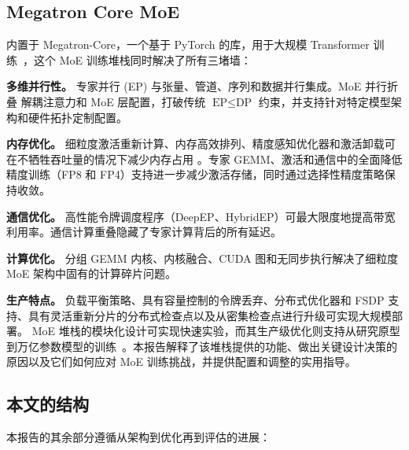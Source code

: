 \documentclass[10pt,logo,copyright]{nvidiatechreport_zh}
\begin{document}
\subsection{Megatron Core MoE}
内置于 Megatron-Core，一个基于 PyTorch 的库，用于大规模 Transformer 训练~\cite{shoeybi2020megatronlmtrainingmultibillionparameter,paszke2019pytorchimperativestylehighperformance}，这个 MoE 训练堆栈同时解决了所有三堵墙：

\textbf{多维并行性。} 专家并行 (EP) 与张量、管道、序列和数据并行集成。MoE 并行折叠 \cite{liu2025moeparallelfoldingheterogeneous} 解耦注意力和 MoE 层配置，打破传统 $\text{EP} \leq \text{DP}$ 约束，并支持针对特定模型架构和硬件拓扑定制配置。

\textbf{内存优化。} 细粒度激活重新计算、内存高效排列、精度感知优化器和激活卸载可在不牺牲吞吐量的情况下减少内存占用 \cite{korthikanti2022reducingactivationrecomputationlarge,a2023learningwithdistributedoptimization}。专家 GEMM、激活和通信中的全面降低精度训练（FP8 和 FP4）支持进一步减少激活存储，同时通过选择性精度策略保持收敛。

\textbf{通信优化。} 高性能令牌调度程序（DeepEP、HybridEP）可最大限度地提高带宽利用率。通信计算重叠隐藏了专家计算背后的所有延迟。

\textbf{计算优化。} 分组 GEMM 内核、内核融合、CUDA 图和无同步执行解决了细粒度 MoE 架构中固有的计算碎片问题。

\textbf{生产特点。} 负载平衡策略、具有容量控制的令牌丢弃、分布式优化器和 FSDP 支持、具有灵活重新分片的分布式检查点以及从密集检查点进行升级可实现大规模部署。
MoE 堆栈的模块化设计可实现快速实验，而其生产级优化则支持从研究原型到万亿参数模型的训练~\cite{nvidiamcoremoeuserguide}。本报告解释了该堆栈提供的功能、做出关键设计决策的原因以及它们如何应对 MoE 训练挑战，并提供配置和调整的实用指导。

\subsection{本文的结构}

本报告的其余部分遵循从架构到优化再到评估的进展：
\end{document}

